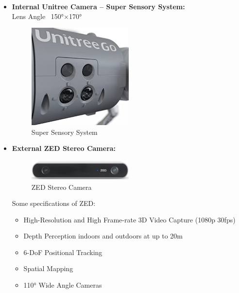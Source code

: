 \documentclass[12pt]{article}
\begin{document}
\begin{itemize}
    \item \textbf{Internal Unitree Camera – Super Sensory System:} \\
          Lens Angle ~150°×170°
          
          \begin{figure}[H]
              \centering
              \includegraphics[width=0.5\textwidth]{SuperSensorySystem.png}
              \caption{Super Sensory System}
          \end{figure}
          
    \item \textbf{External ZED Stereo Camera:} \\
          
          \begin{figure}[H]
              \centering
              \includegraphics[width=0.5\textwidth]{ZEDCam.png}
              \caption{ZED Stereo Camera~\cite{ZEDStereoCamera}}
          \end{figure}
          
          Some specifications of ZED:
          
          \begin{itemize}
              \item High-Resolution and High Frame-rate 3D Video Capture (1080p 30fps)
              \item Depth Perception indoors and outdoors at up to 20m
              \item 6-DoF Positional Tracking
              \item Spatial Mapping
              \item 110° Wide Angle Cameras
          \end{itemize}
          

\end{itemize}
\end{document}
